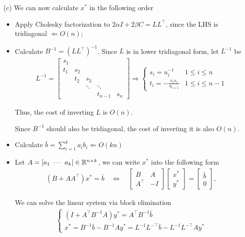 \documentclass[11pt]{article}
\newcommand{\inv}{^{-1}}        %
\newcommand{\T}{^\top}          %
\begin{document}
(c)
We can now calculate $x^*$ in the following order
\begin{itemize}
  \item Apply Cholesky factorization to $2\alpha I + 2\beta C = LL\T$, since the LHS is tridiagonal $\Leftarrow O(n)$;
  \item Calculate $B\inv = (LL\T)\inv$. Since $L$ is in lower tridiagonal form, let $L\inv$ be
  \begin{align*}
    L\inv = 
    \begin{bmatrix}
      s_1 &     &     & \\
      t_1 & s_2 &     & \\
          & t_2 & s_3 & \\
          &     & \ddots & \ddots \\
          &     & & t_{n-1} & s_n
    \end{bmatrix}
    \Rightarrow 
    \begin{cases}
      s_i = u_i\inv & 1\leq i \leq n\\
      t_i = -\frac{v_i s_i}{u_{i+1}} & 1\leq i\leq n-1
    \end{cases}
  \end{align*}

  Thus, the cost of inverting $L$ is $O(n)$. 

  Since $B\inv$ should also be tridiagonal, the cost of inverting it is also $O(n)$.
  \item Calculate $\bar{b} = \sum_{i=1}^{k} a_i b_i \Leftarrow O(kn)$
  \item Let $A = [a_1\ \cdots \ a_k] \in{{\mathbb{R}}}^{n\times k}$, we can write $x^*$ into the following form
  \begin{align*}
    (B + AA\T) x^* = \bar{b} \quad \Leftrightarrow \quad
    \begin{bmatrix}
      B & A\\ A\T & -I
    \end{bmatrix}
    \begin{bmatrix}
      x^*\\ y^*
    \end{bmatrix}
    = 
    \begin{bmatrix}
      \bar{b}\\ 0
    \end{bmatrix},
  \end{align*}
  
  We can solve the linear system via block elimination
  \begin{align*}
    \begin{cases}
      (I + A\T B\inv A) y^* = A\T B\inv \bar{b}\\      
      x^* = B\inv \bar{b} - B\inv A y^* = L\inv L^{-\top} \bar{b} - L\inv L^{-\top} Ay^*
    \end{cases}
  \end{align*}
\end{itemize}
  
\end{document}
